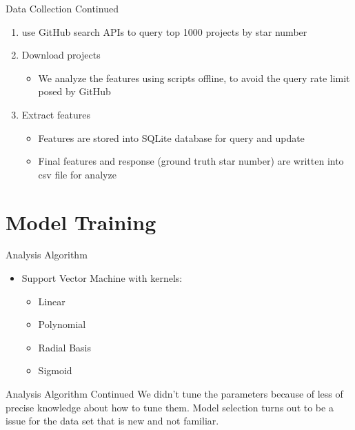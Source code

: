 \documentclass[presentation]{beamer}
\begin{document}
\begin{frame}{Data Collection Continued}
\begin{enumerate}
\item use GitHub search APIs to query top 1000 projects by star number
\item Download projects
  \begin{itemize}
  \item We analyze the features using scripts offline, to avoid the
    query rate limit posed by GitHub
  \end{itemize}
\item Extract features
  \begin{itemize}
  \item Features are stored into SQLite database for query and update
  \item Final features and response (ground truth star number) are
    written into csv file for analyze
  \end{itemize}
\end{enumerate}
\end{frame}

\section{Model Training}
\begin{frame}{Analysis Algorithm}
\begin{itemize}
\item Support Vector Machine with kernels:
  \begin{itemize}
  \item Linear
  \item Polynomial
  \item Radial Basis
  \item Sigmoid
  \end{itemize}
\end{itemize}
\end{frame}

\begin{frame}{Analysis Algorithm Continued}
We didn't tune the parameters because of less of precise knowledge
about how to tune them. Model selection turns out to be a issue for
the data set that is new and not familiar.
\end{frame}
\end{document}
